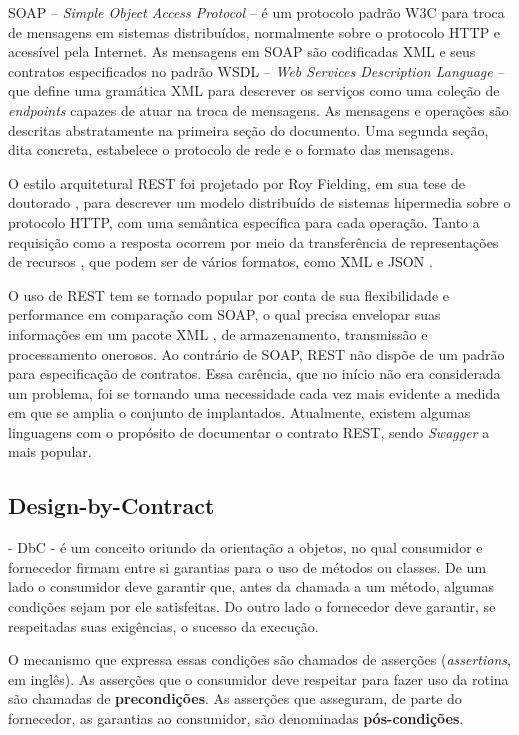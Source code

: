 SOAP -- \textit{Simple Object Access Protocol} -- é um protocolo padrão W3C
para troca de mensagens em sistemas distribuídos, normalmente sobre o
protocolo HTTP e acessível pela Internet. As mensagens em SOAP são codificadas
XML e seus contratos especificados no padrão WSDL -- \textit{Web Services
Description Language} -- que define uma gramática XML para descrever os serviços
como uma coleção de \textit{endpoints} capazes de atuar na troca de mensagens.
As mensagens e operações são descritas abstratamente na primeira seção do
documento. Uma segunda seção, dita concreta, estabelece o protocolo de rede e o
formato das mensagens.

O estilo arquitetural REST foi projetado por Roy Fielding, em sua tese de
doutorado \cite{fielding2000architectural}, para descrever um modelo 
distribuído de sistemas hipermedia sobre o protocolo HTTP, com uma semântica
específica para cada operação.
Tanto a requisição como a resposta ocorrem por meio da transferência de
representações de recursos \cite{mumbaikar2013web}, que podem ser de vários
formatos, como XML e JSON \cite{serrano2014service}. 

O uso de REST tem se tornado popular por conta de sua flexibilidade e
performance em comparação com SOAP, o qual precisa envelopar suas informações em
um pacote XML \cite{mumbaikar2013web}, de armazenamento, transmissão e
processamento onerosos. Ao contrário de SOAP, REST não dispõe de um padrão para
especificação de contratos. Essa carência, que no início não era considerada um problema, foi se
tornando uma necessidade cada vez mais evidente a medida em que se amplia o
conjunto de \wss{} implantados. Atualmente, existem algumas linguagens com o
propósito de documentar o contrato REST, sendo \textit{Swagger} a mais
popular.

\subsection{Design-by-Contract}

\designbycontract{} \cite{meyer1992applying} - DbC - é um conceito
oriundo da orientação a objetos, no qual consumidor e fornecedor firmam entre si garantias para
o uso de métodos ou classes. De um lado o consumidor deve garantir que, antes da
chamada a um método, algumas condições sejam por ele satisfeitas.
Do outro lado o fornecedor deve garantir, se respeitadas suas exigências,
o sucesso da execução.

O mecanismo que expressa essas condições são chamados de asserções
(\textit{assertions}, em inglês). As asserções que o consumidor deve respeitar
para fazer uso da rotina são chamadas de \textbf{precondições}. As asserções que
asseguram, de parte do fornecedor, as garantias ao consumidor, são denominadas
\textbf{pós-condições}.

